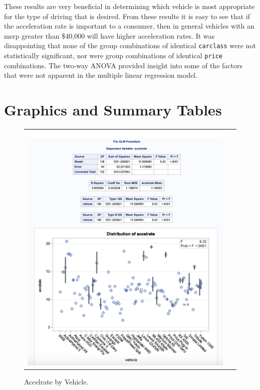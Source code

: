 \documentclass[acmsmall]{acmart}
\begin{document}
These results are very beneficial in determining which vehicle is most appropriate for the type of driving that is desired. From these results it is easy to see that if the acceleration rate is important to a consumer, then in general vehicles with an msrp greater than \$40,000 will have higher acceleration rates. It was disappointing that none of the group combinations of identical \texttt{carclass} were not statistically significant, nor were group combinations of identical \texttt{price} combinations. The two-way ANOVA provided insight into some of the factors that were not apparent in the multiple linear regression model.

\pagebreak
\appendix{} 
\section{Graphics and Summary Tables}
\begin{figure}[H] %
	\centering
	\begin{tabular}{| p{}|}
	\hline
	\\
	\includegraphics[width=0.95\textwidth]{../graphics/AccelrateByVehicle}\\
	\hline
	\end{tabular}	
	\caption{Accelrate by Vehicle.} %
	\label{fig:ABV}
\end{figure}
\end{document}
